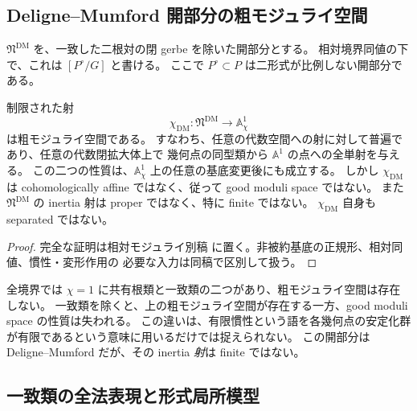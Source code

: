 \subsection{Deligne--Mumford 開部分の粗モジュライ空間}

$\mathfrak N^{\mathrm{DM}}$ を、一致した二根対の閉 gerbe を除いた開部分とする。
相対境界同値の下で、これは $[P^\circ/G]$ と書ける。
ここで $P^\circ\subset P$ は二形式が比例しない開部分である。

\begin{theorem}[粗空間は存在するが良モジュライ射にはならない]
\label{thm:noncubic-dm-coarse}
制限された射
\[
 \chi_{\mathrm{DM}}:\mathfrak N^{\mathrm{DM}}\longrightarrow\mathbb A^1_\chi
\]
は粗モジュライ空間である。
すなわち、任意の代数空間への射に対して普遍であり、任意の代数閉拡大体上で
幾何点の同型類から $\mathbb A^1$ の点への全単射を与える。
この二つの性質は、$\mathbb A^1_\chi$ 上の任意の基底変更後にも成立する。
しかし $\chi_{\mathrm{DM}}$ は cohomologically affine ではなく、従って good moduli space ではない。
また $\mathfrak N^{\mathrm{DM}}$ の inertia 射は proper ではなく、特に finite ではない。
$\chi_{\mathrm{DM}}$ 自身も separated ではない。
\end{theorem}

\begin{proof}
完全な証明は相対モジュライ別稿
\cite[noncubic 境界の相対表示とモジュライ写像]{QuadricModuli2026}
に置く。非被約基底の正規形、相対同値、慣性・変形作用の
必要な入力は同稿で区別して扱う。
\end{proof}

\begin{remark}
全境界では $\chi=1$ に共有根類と一致類の二つがあり、粗モジュライ空間は存在しない。
一致類を除くと、上の粗モジュライ空間が存在する一方、good moduli space の性質は失われる。
この違いは、有限慣性という語を各幾何点の安定化群が有限であるという意味に用いるだけでは捉えられない。
この開部分は Deligne--Mumford だが、その inertia \emph{射}は finite ではない。
\end{remark}

\subsection{一致類の全法表現と形式局所模型}

